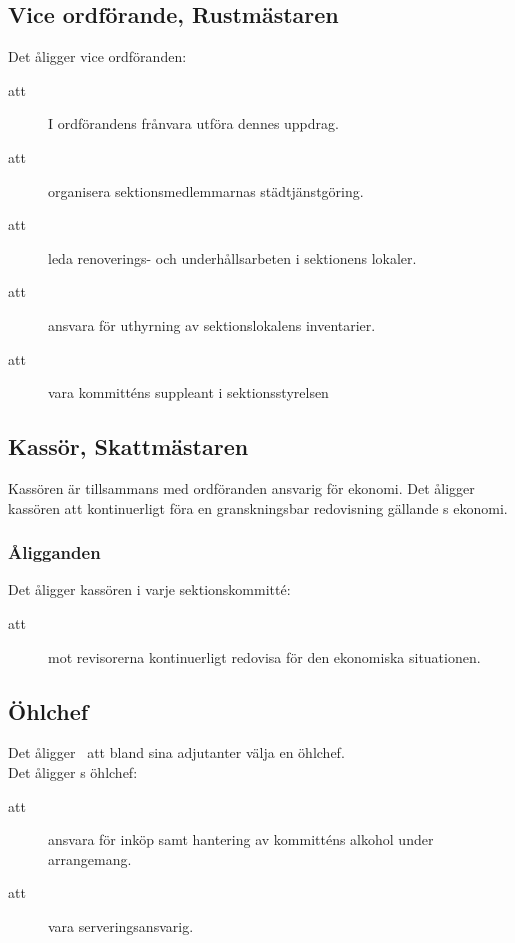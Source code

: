 \subsection{Vice ordförande, Rustmästaren}
Det åligger vice ordföranden:
\begin{description}
\item[att] I ordförandens frånvara utföra dennes uppdrag.

\item[att] organisera sektionsmedlemmarnas städtjänstgöring.

\item[att] leda renoverings- och underhållsarbeten i sektionens lokaler.

\item[att] ansvara för uthyrning av sektionslokalens inventarier.

\item[att] vara kommitténs suppleant i sektionsstyrelsen

\end{description}


\subsection{Kassör, Skattmästaren}
Kassören är tillsammans med ordföranden ansvarig för \forening  ekonomi. Det åligger kassören att kontinuerligt föra en granskningsbar redovisning gällande \forening s ekonomi.\\

\subsubsection{Åligganden}
Det åligger kassören i varje sektionskommitté:
\begin{description}
\item[att] mot revisorerna kontinuerligt redovisa för den ekonomiska situationen.

\end{description}

\subsection{Öhlchef}
Det åligger \forening \ att bland sina adjutanter välja en öhlchef. \\
Det åligger \forening s öhlchef:
\begin{description}
\item[att] ansvara för inköp samt hantering av kommitténs alkohol under arrangemang.
\item[att] vara serveringsansvarig.
\end{description}


